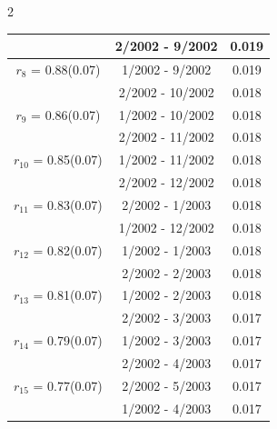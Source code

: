 \begin{multicols}{2}
{\begin{tabular}{ccc}
&        2/2002 -  9/2002 &        0.019  \vspace{-.02in} \\ \hline 
  $r_{ 8}$ = 0.88(0.07) &       1/2002 -  9/2002 &        0.019   \vspace{-.10in} \\  
&        2/2002 - 10/2002 &        0.018  \vspace{-.02in} \\ \hline 
  $r_{ 9}$ = 0.86(0.07) &       1/2002 - 10/2002 &        0.018   \vspace{-.10in} \\  
&        2/2002 - 11/2002 &        0.018  \vspace{-.02in} \\ \hline 
  $r_{10}$ = 0.85(0.07) &       1/2002 - 11/2002 &        0.018   \vspace{-.10in} \\  
&        2/2002 - 12/2002 &        0.018  \vspace{-.02in} \\ \hline 
  $r_{11}$ = 0.83(0.07) &       2/2002 -  1/2003 &        0.018   \vspace{-.10in} \\  
&        1/2002 - 12/2002 &        0.018  \vspace{-.02in} \\ \hline 
  $r_{12}$ = 0.82(0.07) &       1/2002 -  1/2003 &        0.018   \vspace{-.10in} \\  
&        2/2002 -  2/2003 &        0.018  \vspace{-.02in} \\ \hline 
  $r_{13}$ = 0.81(0.07) &       1/2002 -  2/2003 &        0.018   \vspace{-.10in} \\  
&        2/2002 -  3/2003 &        0.017  \vspace{-.02in} \\ \hline 
  $r_{14}$ = 0.79(0.07) &       1/2002 -  3/2003 &        0.017   \vspace{-.10in} \\  
&        2/2002 -  4/2003 &        0.017  \vspace{-.02in} \\ \hline 
  $r_{15}$ = 0.77(0.07) &       2/2002 -  5/2003 &        0.017   \vspace{-.10in} \\  
&        1/2002 -  4/2003 &        0.017  \vspace{-.02in} \\ \hline 

\end{tabular}}
\end{multicols}
